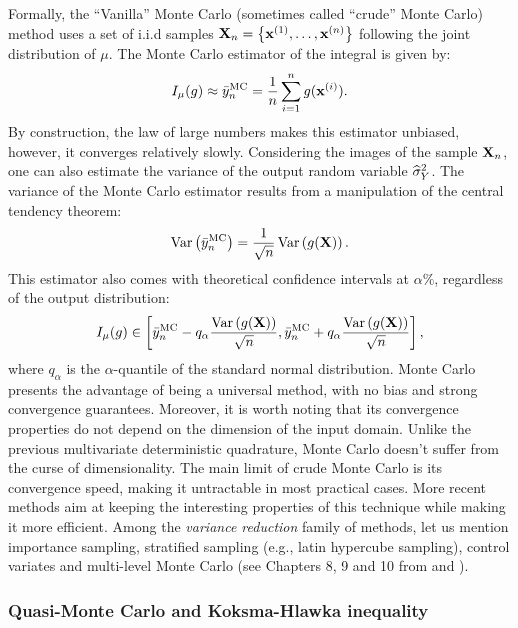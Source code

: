 Formally, the ``Vanilla'' Monte Carlo (sometimes called ``crude'' Monte Carlo) method uses a set of i.i.d samples ${\bf X}_n = \left\{{\bf x}^{(1)}, \dots, {\bf x}^{(n)}\right\}$ following the joint distribution of $\mu$. 
The Monte Carlo estimator of the integral is given by: 
\begin{equation}
    I_{\mu}(g) \approx \Bar{y}_n^{\textrm{MC}} = \frac1n \sum_{i=1}^{n} g({\bf x}^{(i)}).
\end{equation}
By construction, the law of large numbers makes this estimator unbiased, however, it converges relatively slowly. 
Considering the images of the sample ${\bf X}_n$, one can also estimate the variance of the output random variable $\widehat{\sigma}^2_Y$.
The variance of the Monte Carlo estimator results from a manipulation of the central tendency theorem:
\begin{equation}
    \operatorname{Var}\left(\Bar{y}_n^{\textrm{MC}}\right) = \frac{1}{\sqrt{n}} \operatorname{Var}\left(g({\bf X})\right). 
\end{equation}
This estimator also comes with theoretical confidence intervals at $\alpha \%$, regardless of the output distribution: 
\begin{equation}
    I_{\mu}(g) \in \left[\Bar{y}_n^{\textrm{MC}}  - q_\alpha \frac{\operatorname{Var}\left(g({\bf X})\right)}{\sqrt{n}}, \Bar{y}_n^{\textrm{MC}}  + q_\alpha \frac{\operatorname{Var}\left(g({\bf X})\right)}{\sqrt{n}} \right],
\end{equation}
where $q_\alpha$ is the $\alpha$-quantile of the standard normal distribution.
Monte Carlo presents the advantage of being a universal method, with no bias and strong convergence guarantees. 
Moreover, it is worth noting that its convergence properties do not depend on the dimension of the input domain. 
Unlike the previous multivariate deterministic quadrature, Monte Carlo doesn't suffer from the curse of dimensionality. 
The main limit of crude Monte Carlo is its convergence speed, making it untractable in most practical cases. 
More recent methods aim at keeping the interesting properties of this technique while making it more efficient.
Among the \textit{variance reduction} family of methods, let us mention importance sampling, stratified sampling (e.g., latin hypercube sampling), control variates and multi-level Monte Carlo (see Chapters 8, 9 and 10 from \citet{owen_2013} and \citep{giles_2008}).


\subsubsection{Quasi-Monte Carlo and Koksma-Hlawka inequality}

